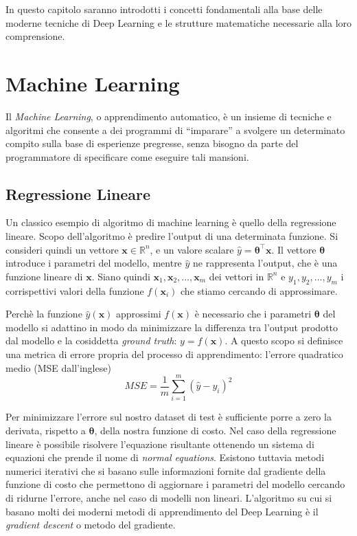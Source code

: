 
In questo capitolo saranno introdotti i concetti fondamentali alla base delle
moderne tecniche di Deep Learning e le strutture matematiche necessarie alla
loro comprensione. \\

\section{Machine Learning}
Il \emph{Machine Learning}, o apprendimento automatico, è un insieme di
tecniche e algoritmi che consente a dei programmi di ``imparare'' a svolgere
un determinato compito sulla base di esperienze pregresse, senza bisogno da
parte del programmatore di specificare come eseguire tali mansioni. 
\subsection{Regressione Lineare}
Un classico esempio di algoritmo di machine learning è quello della regressione
lineare. Scopo dell'algoritmo è predire l'output di una determinata funzione.
Si consideri quindi un vettore $ \bm x \in \mathbb{R}^n $, e un valore scalare
$\hat{y} = \bm \theta^\intercal \bm x$. Il vettore $\bm \theta$ introduce i
parametri del modello, mentre $\hat{y}$ ne rappresenta l'output, che è una
funzione lineare di $\bm x$. Siano quindi $ \bm x_1, \bm x_2, \dotsc, \bm x_m $
dei vettori in $\mathbb{R}^n$ e  $ y_1, y_2, \dotsc, y_m $ i corrispettivi
valori della funzione $f(\bm x_i)$ che stiamo cercando di approssimare.

Perchè la funzione $\hat{y}(\bm x)$ approssimi $f(\bm x)$ è necessario che i
parametri $\bm \theta$ del modello si adattino in modo da minimizzare la differenza
tra l'output prodotto dal modello e la cosiddetta \emph{ground truth}: $y =
f(\bm x)$. A questo scopo si definisce una metrica di errore propria del
processo di apprendimento: l'errore quadratico medio (MSE dall'inglese) 
\begin{equation} \label{eq:mse}
  MSE = \frac{1}{m} \sum_{i=1}^m{{(\hat{y} - y_i)}^2} 
\end{equation}

Per minimizzare l'errore sul nostro dataset di test è sufficiente porre a zero
la derivata, rispetto a $\bm \theta$, della nostra funzione di costo. Nel caso
della regressione lineare è possibile risolvere l'equazione risultante
ottenendo un sistema di equazioni che prende il nome di 
\emph{normal equations}.
Esistono tuttavia metodi numerici iterativi che si basano sulle informazioni
fornite dal gradiente della funzione di costo che permettono di aggiornare i
parametri del modello cercando di ridurne l'errore, anche nel caso di modelli
non lineari. L'algoritmo su cui si basano molti dei moderni metodi di
apprendimento del Deep Learning è il \emph{gradient descent} o metodo del
gradiente.

